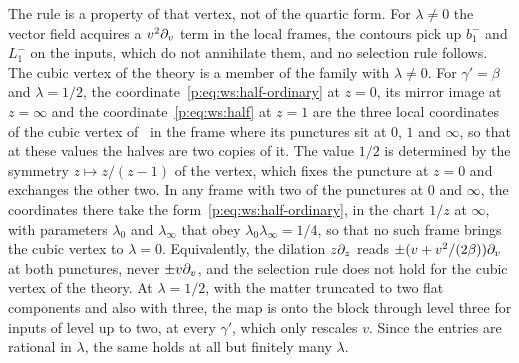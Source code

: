 The rule is a property of that vertex, not of the quartic form.
For $\lambda \neq 0$ the vector field acquires a $v^2 \partial_v$ term in the local frames, the contours pick up $b_1^-$ and $L_1^-$ on the inputs, which do not annihilate them, and no selection rule follows.
The cubic vertex of the theory is a member of the family with $\lambda \neq 0$.
For $\gamma' = \beta$ and $\lambda = 1 / 2$, the coordinate~\eqref{p:eq:ws:half-ordinary} at $z = 0$, its mirror image at $z = \infty$ and the coordinate~\eqref{p:eq:ws:half} at $z = 1$ are the three local coordinates of the cubic vertex of~\cite{Erbin:2026:SL2CVerticesClosed} in the frame where its punctures sit at $0$, $1$ and $\infty$, so that at these values the halves are two copies of it.
The value $1 / 2$ is determined by the symmetry $z \mapsto z / (z - 1)$ of the vertex, which fixes the puncture at $z = 0$ and exchanges the other two.
In any frame with two of the punctures at $0$ and $\infty$, the coordinates there take the form~\eqref{p:eq:ws:half-ordinary}, in the chart $1 / z$ at $\infty$, with parameters $\lambda_0$ and $\lambda_\infty$ that obey $\lambda_0 \lambda_\infty = 1 / 4$, so that no such frame brings the cubic vertex to $\lambda = 0$.
Equivalently, the dilation $z \partial_z$ reads $\pm (v + v^2 / (2 \beta)) \partial_v$ at both punctures, never $\pm v \partial_v$, and the selection rule does not hold for the cubic vertex of the theory.
At $\lambda = 1 / 2$, with the matter truncated to two flat components and also with three, the map is onto the block through level three for inputs of level up to two, at every $\gamma'$, which only rescales $v$.
Since the entries are rational in $\lambda$, the same holds at all but finitely many $\lambda$.

